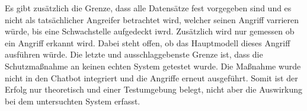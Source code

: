 Es gibt zusätzlich die Grenze, dass alle Datensätze fest vorgegeben sind und es nicht als tatsächlicher Angreifer betrachtet wird, welcher seinen Angriff 
varrieren würde, bis eine Schwachstelle aufgedeckt iwrd. Zusätzlich wird nur gemessen ob ein Angriff erkannt wird. Dabei steht offen, ob das Hauptmodell dieses
Angriff ausführen würde. Die letzte und ausschlaggebenste Grenze ist, dass die Schutzmaßnahme an keinen echten System getestet wurde. Die Maßnahme wurde nicht 
in den Chatbot integriert und die Angriffe erneut ausgeführt. Somit ist der Erfolg nur theoretisch und einer Testumgebung belegt, nicht aber die Auswirkung bei
dem untersuchten System erfasst. \\